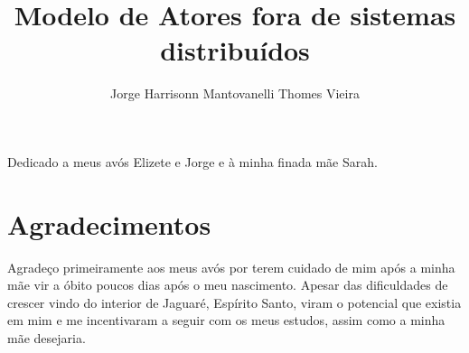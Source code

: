 \documentclass[a4paper,12pt,twoside,english,brazilian]{book}
\title{Modelo de Atores fora de sistemas distribuídos}[aplicando o padrão arquitetural em aplicações centralizadas]
\author{Jorge Harrisonn Mantovanelli Thomes Vieira}
\begin{document}

\frontmatter

\pagestyle{plain}

\onehalfspacing %

\maketitle %


\begin{dedicatoria}
Dedicado a meus avós Elizete e Jorge e à minha finada mãe Sarah.
\end{dedicatoria}


\chapter*{Agradecimentos}

Agradeço primeiramente aos meus avós por terem cuidado de mim após a minha mãe vir a óbito poucos dias após o meu nascimento. Apesar das dificuldades de crescer vindo do interior de Jaguaré, Espírito Santo, viram o potencial que existia em mim e me incentivaram a seguir com os meus estudos, assim como a minha mãe desejaria.
\end{document}
